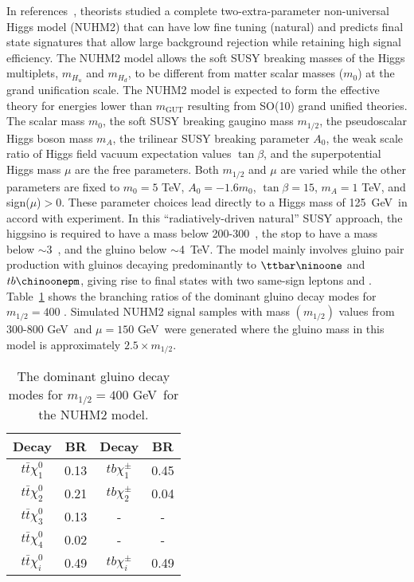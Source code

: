 In references~\cite{Baer:2013xua,Baer:2013yha,Baer:2016usl}, 
theorists studied a complete two-extra-parameter non-universal Higgs model (NUHM2) 
that can have low fine tuning (natural) and
predicts final state signatures that allow large background rejection while retaining high 
signal efficiency. 
The NUHM2 model allows the soft SUSY breaking masses of the Higgs multiplets, $m_{H_{u}}$ and $m_{H_{d}}$, to be different from 
matter scalar masses ($m_{0}$) at the grand unification scale. The NUHM2 model is expected to form the effective theory for energies 
lower than $m_\textrm{GUT}$ resulting from SO(10) grand unified theories.
The scalar mass $m_{0}$, the soft SUSY breaking gaugino mass $m_{1/2}$, the pseudoscalar Higgs boson mass $m_{A}$, the trilinear SUSY breaking parameter $A_{0}$, the weak scale ratio of Higgs field vacuum expectation values $\tan\beta$, and the superpotential Higgs mass $\mu$ are the free parameters.
Both $m_{1/2}$ and $\mu$ are varied while the other parameters are fixed to $m_{0} = 5$ TeV, $A_{0} = -1.6m_{0}$, $\tan\beta = 15$, $m_{A} = 1$ TeV, and sign($\mu$)$>$0. 
These parameter choices lead directly to a Higgs mass of 125~GeV~in accord with experiment.  In this ``radiatively-driven natural'' SUSY approach, the higgsino is
required to have a mass below 200-300~\GeV, the stop to have a mass below
$\sim$3~\TeV, and the gluino below $\sim$4~TeV.
The model mainly involves gluino pair production with gluinos decaying 
predominantly to $\ttbar\ninoone$ and $tb\chinoonepm$, giving rise to final 
states with two same-sign leptons and \met.
Table~\ref{tab:NUHM2} shows the branching ratios of the dominant gluino decay modes for $m_{1/2} = 400$ \GeV.
Simulated NUHM2 signal samples with mass $(m_{1/2})$ values from 300-800 GeV~and $\mu = 150$ GeV~were generated where 
the gluino mass in this model is approximately $2.5\times m_{1/2}$.

\begin{table}[t!]
\begin{center}
\begin{tabular}{|c|c||c|c|}
\hline
\hline
Decay & BR & Decay & BR\\
\hline
$t\bar{t}\chi^{0}_{1}$ & 0.13 & $tb\chi^{\pm}_{1}$ & 0.45\\
$t\bar{t}\chi^{0}_{2}$ & 0.21 & $tb\chi^{\pm}_{2}$ & 0.04\\
$t\bar{t}\chi^{0}_{3}$ & 0.13 & - & - \\
$t\bar{t}\chi^{0}_{4}$ & 0.02 & - & - \\
\hline
$t\bar{t}\chi^{0}_{i}$ & 0.49 & $tb\chi^{\pm}_{i}$ & 0.49\\
\hline
\hline
\end{tabular}
\caption{The dominant gluino decay modes for $m_{1/2} = 400$ GeV~for the NUHM2 model.}
\label{tab:NUHM2}
\end{center}
\end{table}
